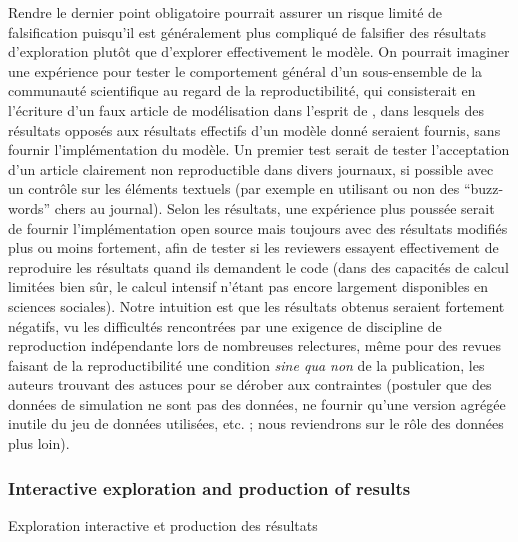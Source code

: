 {Rendre le dernier point obligatoire pourrait assurer un risque limité de falsification puisqu'il est généralement plus compliqué de falsifier des résultats d'exploration plutôt que d'explorer effectivement le modèle. On pourrait imaginer une expérience pour tester le comportement général d'un sous-ensemble de la communauté scientifique au regard de la reproductibilité, qui consisterait en l'écriture d'un faux article de modélisation dans l'esprit de \cite{zilsel2015canular}, dans lesquels des résultats opposés aux résultats effectifs d'un modèle donné seraient fournis, sans fournir l'implémentation du modèle. Un premier test serait de tester l'acceptation d'un article clairement non reproductible dans divers journaux, si possible avec un contrôle sur les éléments textuels (par exemple en utilisant ou non des ``buzz-words'' chers au journal). Selon les résultats, une expérience plus poussée serait de fournir l'implémentation open source mais toujours avec des résultats modifiés plus ou moins fortement, afin de tester si les reviewers essayent effectivement de reproduire les résultats quand ils demandent le code (dans des capacités de calcul limitées bien sûr, le calcul intensif n'étant pas encore largement disponibles en sciences sociales). Notre intuition est que les résultats obtenus seraient fortement négatifs, vu les difficultés rencontrées par une exigence de discipline de reproduction indépendante lors de nombreuses relectures, même pour des revues faisant de la reproductibilité une condition \emph{sine qua non} de la publication, les auteurs trouvant des astuces pour se dérober aux contraintes (postuler que des données de simulation ne sont pas des données, ne fournir qu'une version agrégée inutile du jeu de données utilisées, etc. ; nous reviendrons sur le rôle des données plus loin).
}






\subsubsection{Interactive exploration and production of results}{Exploration interactive et production des résultats}


